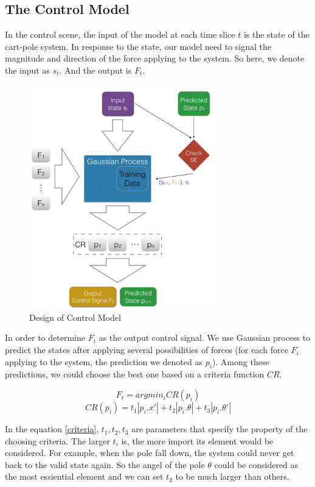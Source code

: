 \documentclass[11pt,twoside,a4paper]{article}
\begin{document}
\subsection{The Control Model}
In the control scene, the input of the model at each time slice $t$ is the
state of the cart-pole system. In response to the state, our model
need to signal the magnitude and direction of the force applying to
the system. So here, we denote the input as $s_t$. And the
output is $F_t$.\\
\begin{figure}[!]
\begin{center}
\includegraphics[width=8cm]{control-model.png}
\caption{Design of Control Model}
\label{control-model}
\end{center}
\end{figure}

In order to determine $F_t$ as the output control signal. We
use Gaussian process to predict the states after applying several
possibilities of forces (for each force $F_i$ applying to the system,
the prediction we denoted as $p_i$). Among these predictions, we could
choose the best one based on a criteria function $CR$.
\begin{center}
\begin{equation}
F_t = argmin_i{CR(p_i)}
\end{equation}
\begin{equation} \label{criteria}
CR(p_i) = t_1 |p_i.x'| + t_2 |p_i.\theta| + t_3 |p_i.\theta'|
\end{equation}
\end{center}

In the equation \ref{criteria}, $t_1, t_2, t_3$ are parameters that
specify the property of the choosing criteria. The larger $t_i$ is,
the more import its element would be considered. For example, when the
pole fall down, the system could never get back to the valid state
again. So the angel of the pole $\theta$ could be considered as the most
essiential element and we can set $t_2$ to be much larger than others.\\
\end{document}
